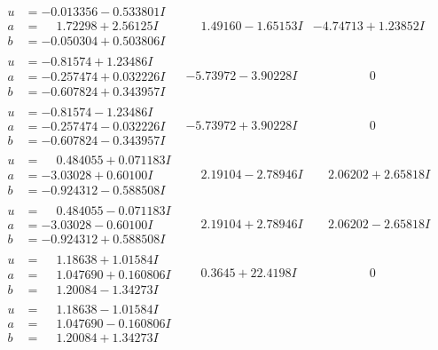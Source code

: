 \documentclass[1p]{elsarticle_modified}
\theoremstyle{definition}
\begin{document}
$$\begin{array}{c|c|c}
\begin{aligned}
u &= -0.013356 - 0.533801 I \\
a &= \phantom{-}1.72298 + 2.56125 I \\
b &= -0.050304 + 0.503806 I\end{aligned}
 & \phantom{-}1.49160 - 1.65153 I & -4.74713 + 1.23852 I \\ \hline\begin{aligned}
u &= -0.81574 + 1.23486 I \\
a &= -0.257474 + 0.032226 I \\
b &= -0.607824 + 0.343957 I\end{aligned}
 & -5.73972 - 3.90228 I & \phantom{-0.000000 } 0 \\ \hline\begin{aligned}
u &= -0.81574 - 1.23486 I \\
a &= -0.257474 - 0.032226 I \\
b &= -0.607824 - 0.343957 I\end{aligned}
 & -5.73972 + 3.90228 I & \phantom{-0.000000 } 0 \\ \hline\begin{aligned}
u &= \phantom{-}0.484055 + 0.071183 I \\
a &= -3.03028 + 0.60100 I \\
b &= -0.924312 - 0.588508 I\end{aligned}
 & \phantom{-}2.19104 - 2.78946 I & \phantom{-}2.06202 + 2.65818 I \\ \hline\begin{aligned}
u &= \phantom{-}0.484055 - 0.071183 I \\
a &= -3.03028 - 0.60100 I \\
b &= -0.924312 + 0.588508 I\end{aligned}
 & \phantom{-}2.19104 + 2.78946 I & \phantom{-}2.06202 - 2.65818 I \\ \hline\begin{aligned}
u &= \phantom{-}1.18638 + 1.01584 I \\
a &= \phantom{-}1.047690 + 0.160806 I \\
b &= \phantom{-}1.20084 - 1.34273 I\end{aligned}
 & \phantom{-}0.3645 + 22.4198 I & \phantom{-0.000000 } 0 \\ \hline\begin{aligned}
u &= \phantom{-}1.18638 - 1.01584 I \\
a &= \phantom{-}1.047690 - 0.160806 I \\
b &= \phantom{-}1.20084 + 1.34273 I\end{aligned}

\end{array}$$
\end{document}
